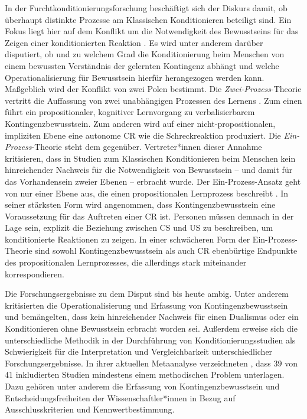 		In der Furchtkonditionierungsforschung beschäftigt sich der Diskurs damit, ob überhaupt distinkte Prozesse am Klassischen Konditionieren beteiligt sind. Ein Fokus liegt hier auf dem Konflikt um die Notwendigkeit des Bewusstseins für das Zeigen einer konditionierten Reaktion \parencite[für systematische Übersichtsarbeiten siehe][]{LOVIBOND2002, MERTENS2020}. Es wird unter anderem darüber disputiert, ob und zu welchem Grad die Konditionierung beim Menschen von einem bewussten Verständnis der gelernten Kontingenz abhängt und welche Operationalisierung für Bewusstsein hierfür herangezogen werden kann. Maßgeblich wird der Konflikt von zwei Polen bestimmt. Die \textit{Zwei-Prozess}-Theorie vertritt die Auffassung von zwei unabhängigen Prozessen des Lernens \parencite{HAMM1996, HAMM2005, OEHMANN2001, WEIKE2007}. Zum einen führt ein propositionaler, kognitiver Lernvorgang zu verbalisierbarem Kontingenzbewusstsein. Zum anderen wird auf einer nicht-propositionalen, impliziten Ebene eine autonome CR wie die Schreckreaktion produziert. 
		Die \textit{Ein-Prozess}-Theorie steht dem gegenüber. Vertreter*innen dieser Annahme kritisieren, dass in Studien zum Klassischen Konditionieren beim Menschen kein hinreichender Nachweis für die Notwendigkeit von Bewusstsein -- und damit für das Vorhandensein zweier Ebenen -- erbracht wurde. Der Ein-Prozess-Ansatz geht von nur einer Ebene aus, die einen propositionalen Lernprozess beschreibt \parencite{LOVIBOND2002, DEHOUWER2014, DEHOUWER2009, MITCHELL2009, MERTENS2020}. In seiner stärksten Form wird angenommen, dass Kontingenzbewusstsein eine Voraussetzung für das Auftreten einer CR ist. Personen müssen demnach in der Lage sein, explizit die Beziehung zwischen CS und US zu beschreiben, um konditionierte Reaktionen zu zeigen. In einer schwächeren Form der Ein-Prozess-Theorie sind sowohl Kontingenzbewusstsein als auch CR ebenbürtige Endpunkte des propositionalen Lernprozesses, die allerdings stark miteinander korrespondieren. 

		Die Forschungsergebnisse zu dem Disput sind bis heute ambig. Unter anderem kritisierten \textcite{LOVIBOND2002} die Operationalisierung und Erfassung von Kontingenzbewusstsein und bemängelten, dass kein hinreichender Nachweis für einen Dualismus oder ein Konditionieren ohne Bewusstsein erbracht worden sei. Außerdem erweise sich die unterschiedliche Methodik in der Durchführung von Konditionierungsstudien als Schwierigkeit für die Interpretation und Vergleichbarkeit unterschiedlicher Forschungsergebnisse. In ihrer aktuellen Metaanalyse verzeichneten \textcite{MERTENS2020}, dass $39$ von $41$ inkludierten Studien mindestens einem methodischen Problem unterlagen. Dazu gehören unter anderem die Erfassung von Kontingenzbewusstsein und Entscheidungsfreiheiten der Wissenschaftler*innen in Bezug auf Ausschlusskriterien und Kennwertbestimmung.
		
